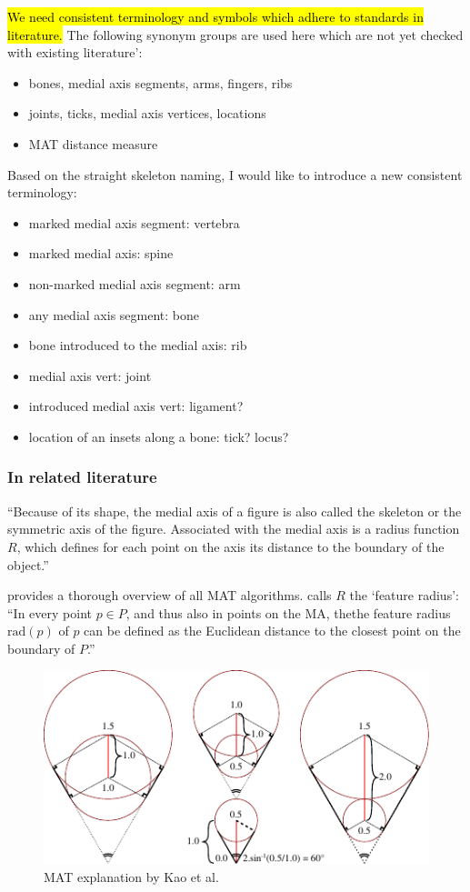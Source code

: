 \hl{We need consistent terminology and symbols which adhere to standards in literature.}
The following synonym groups are used here which are not yet checked with existing literature':
\begin{itemize}
\item bones, medial axis segments, arms, fingers, ribs
\item joints, ticks, medial axis vertices, locations
\item MAT distance measure
\end{itemize}


Based on the straight skeleton naming, I would like to introduce a new consistent terminology:
\begin{itemize}
\item marked medial axis segment: vertebra
\item marked medial axis: spine
\item non-marked medial axis segment: arm
\item any medial axis segment: bone
\item bone introduced to the medial axis: rib
\item medial axis vert: joint
\item introduced medial axis vert: ligament?
\item location of an insets along a bone: tick? locus?
\end{itemize}


\subsubsection{In related literature}

``Because of its shape, the medial axis of a figure is also called the skeleton or the symmetric axis of the figure.
Associated with the medial axis is a radius function $R$, which defines for each point on the axis its distance to the boundary of the object.''
\cite{lee1982medial}

\cite{Moesen2011} provides a thorough overview of all MAT algorithms.
\cite{Moesen2011} calls $R$ the `feature radius': ``In every point $p \in P$, and thus also in points on the MA, thethe feature radius $\text{rad}(p)$ of $p$ can be defined as the Euclidean distance to the closest point on the boundary of $P$.''

\cite{kao1998optimal}
\begin{figure}[H]
\centering
\includegraphics[width=.9\columnwidth]{sources/method/distance_based_angles.pdf}
\caption{MAT explanation by Kao et al.}
\end{figure}

